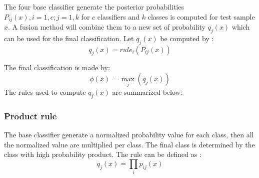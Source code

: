\documentclass[conference]{IEEEtran}
\begin{document}

The four base classifier generate the posterior probabilities $P_{ij}(x), i = 1,c; j = 1,k$ for $c$ classifiers and $k$ classes is computed for test sample $x$. A fusion method will  combine them to a new set of probability  $q_j(x)$ which can be used for the final classification. Let $q_j(x)$ be computed by :
\[
q_j(x)=rule_i\left(P_{ij}(x)\right)
\]

The final classification is made by:
\[
\phi(x)=\max\limits_j(q_j(x))
\]
The rules used to compute $q_j(x)$ are summarized below:

%
%
\subsubsection{Product rule}
The base classifier generate a normalized probability value for each class, then all the normalized value are multiplied per class. The final class is determined by the class with high probability product. The rule can be defined as :
\[
q_j(x)=\prod\limits_i{p_{ij}(x)}
\]
\end{document}
